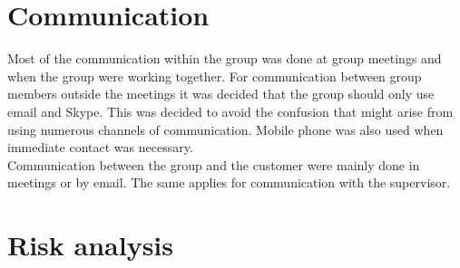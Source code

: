 \section{Communication}
Most of the communication within the group was done at group meetings and when the group were working together. For communication between group members outside the meetings it was decided that the group should only use email and Skype. This was decided to avoid the confusion that might arise from using numerous channels of communication. Mobile phone was also used when immediate contact was necessary.\\
\newline
Communication between the group and the customer were mainly done in meetings or by email. The same applies for communication with the supervisor.

\section{Risk analysis}

